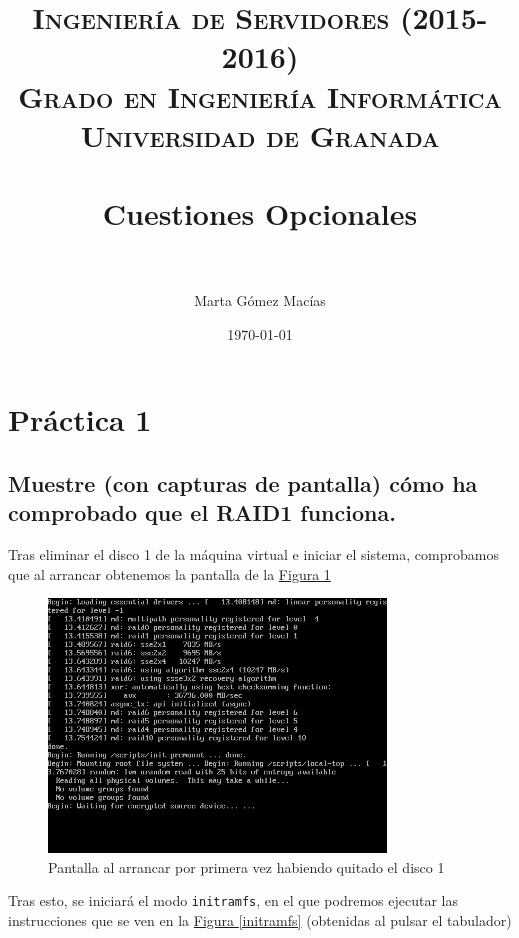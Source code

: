 \documentclass[10pt,a4paper,spanish]{article}
\title{
\normalfont \normalsize 
\textsc{{\bf Ingeniería de Servidores (2015-2016)} \\ Grado en Ingeniería Informática \\ Universidad de Granada} \\ [25pt] %
\horrule{0.5pt} \\[0.4cm] %
\huge Cuestiones Opcionales \\ %
\horrule{2pt} \\[0.5cm] %
}
\author{Marta Gómez Macías} %
\date{\normalsize\today} %
\numberwithin{equation}{section} %
\numberwithin{figure}{section} %
\numberwithin{table}{section} %
\begin{document}
\renewcommand{\listtablename}{Índice de tablas}
\renewcommand{\tablename}{Tabla} 

\maketitle %

\newpage %

\tableofcontents %

\listoffigures


\newpage

\section{Práctica 1}
\subsection{Muestre (con capturas de pantalla) cómo ha comprobado que el RAID1 funciona.}
Tras eliminar el disco 1 de la máquina virtual e iniciar el sistema, comprobamos que al arrancar obtenemos la pantalla de la \hyperref[raid1]{Figura \ref*{raid1}}

\begin{figure}[!h]
\centering
\includegraphics[width=0.8\textwidth]{1_7}
\caption{Pantalla al arrancar por primera vez habiendo quitado el disco 1}
\label{raid1}
\end{figure}

Tras esto, se iniciará el modo \texttt{initramfs}, en el que podremos ejecutar las instrucciones que se ven en la \hyperref[initramfs]{Figura \ref*{initramfs}} (obtenidas al pulsar el tabulador)
\end{document}

